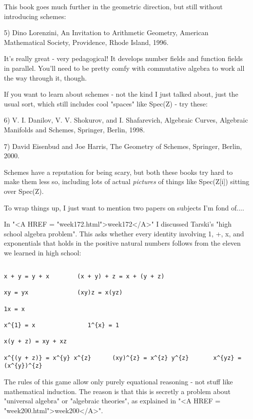 This book goes much further in the geometric direction, but still
without introducing schemes:

5) Dino Lorenzini, An Invitation to Arithmetic Geometry, 
American Mathematical Society, Providence, Rhode Island, 1996.

It's really great - very pedagogical!  It develops number fields and
function fields in parallel.  You'll need to be pretty comfy with 
commutative algebra to work all the way through it, though.

If you want to learn about schemes - not the kind I just talked about,
just the usual sort, which still includes cool "spaces" like 
Spec(Z) - 
try these:

6) V. I. Danilov, V. V. Shokurov, and I. Shafarevich, Algebraic Curves, 
Algebraic Manifolds and Schemes, Springer, Berlin, 1998.  

7) David Eisenbud and Joe Harris, The Geometry of Schemes, Springer,
Berlin, 2000.

Schemes have a reputation for being scary, but both these books try hard
to make them less so, including lots of actual \emph{pictures} of things like
Spec(Z[i]) sitting over Spec(Z).

To wrap things up, I just want to mention two papers on subjects I'm 
fond of....

In "<A HREF = "week172.html">week172</A>" I discussed Tarski's "high school algebra problem".
This asks whether every identity involving 1, +, x, and exponentials 
that holds in the positive natural numbers follows from the eleven
we learned in high school:


\begin{verbatim}

x + y = y + x        (x + y) + z = x + (y + z) 

xy = yx              (xy)z = x(yz)

1x = x

x^{1} = x               1^{x} = 1

x(y + z) = xy + xz 

x^{(y + z)} = x^{y} x^{z}      (xy)^{z} = x^{z} y^{z}       x^{yz} = (x^{y})^{z} 
\end{verbatim}
    

The rules of this game allow only purely equational reasoning - not 
stuff like mathematical induction.  The reason is that this is secretly 
a problem about "universal algebra" or "algebraic theories", as 
explained in "<A HREF = "week200.html">week200</A>".

